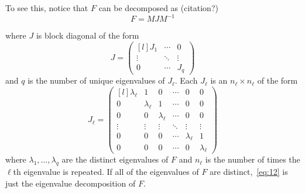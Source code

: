 \documentclass[12pt,fleqn]{article}
\begin{document}
To see this, notice that $F$ can be decomposed as (citation?)
\begin{equation}
  \label{eq:12}
  F = M J M^{-1}
\end{equation}

where $J$ is block diagonal of the form
\[
J = \begin{pmatrix*}[l]
  J_1 & \cdots & 0 \\
  \vdots & \ddots & \vdots \\
  0 & \cdots & J_q
\end{pmatrix*}
\]
and $q$ is the number of unique eigenvalues of $J_{\ell}$. Each
$J_\ell$ is an $n_\ell \times n_\ell$ of the form
\[
J_\ell =
\begin{pmatrix*}[l]
  \lambda_\ell & 1 & 0 & \cdots & 0 & 0 \\
  0 & \lambda_\ell & 1 & \cdots & 0 & 0 \\
  0 & 0 & \lambda_\ell & \cdots & 0 & 0 \\
  \vdots & \vdots & \vdots & \ddots & \vdots & \vdots \\
  0 & 0 & 0 & \cdots & \lambda_\ell & 1 \\
  0 & 0 & 0 & \cdots & 0 & \lambda_\ell
\end{pmatrix*}
\]
where $\lambda_1,\dots,\lambda_q$ are the distinct eigenvalues of $F$
and $n_\ell$ is the number of times the $\ell$th eigenvalue is
repeated.  If all of the eigenvalues of $F$ are
distinct,~\eqref{eq:12} is just the eigenvalue decomposition of $F$.
\end{document}
